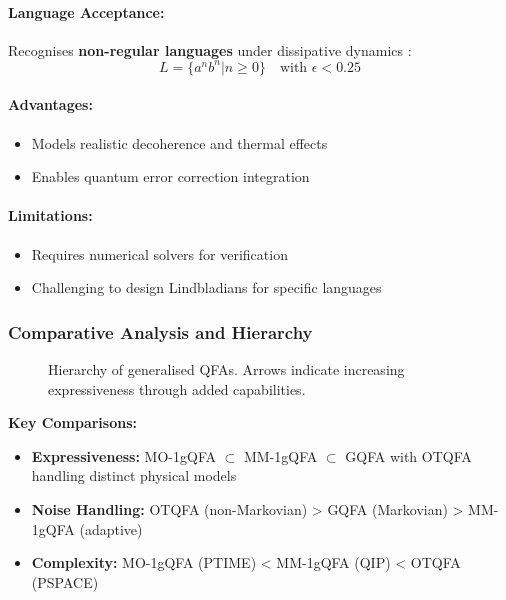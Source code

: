 \paragraph{Language Acceptance:}
Recognises \textbf{non-regular languages} under dissipative dynamics \cite{hirvensalo2012quantum}:
\[
L = \{a^nb^n | n \geq 0\} \quad \text{with } \epsilon < 0.25 
\]
\cite{hirvensalo2012quantum}

\paragraph{Advantages:}
\begin{itemize}
    \item Models realistic decoherence and thermal effects
    \item Enables quantum error correction integration
\end{itemize}

\paragraph{Limitations:}
\begin{itemize}
    \item Requires numerical solvers for verification
    \item Challenging to design Lindbladians for specific languages
\end{itemize}

\subsubsection*{Comparative Analysis and Hierarchy}
\begin{figure}[h]
\centering
{}
\caption{Hierarchy of generalised QFAs. Arrows indicate increasing expressiveness through added capabilities.}
\label{fig:gqfa-hierarchy}
\end{figure}

\textbf{Key Comparisons:}
\begin{itemize}
    \item \textbf{Expressiveness:} MO-1gQFA $\subset$ MM-1gQFA $\subset$ GQFA with OTQFA handling distinct physical models
    \item \textbf{Noise Handling:} OTQFA (non-Markovian) > GQFA (Markovian) > MM-1gQFA (adaptive)
    \item \textbf{Complexity:} MO-1gQFA (PTIME) < MM-1gQFA (QIP) < OTQFA (PSPACE)
\end{itemize}